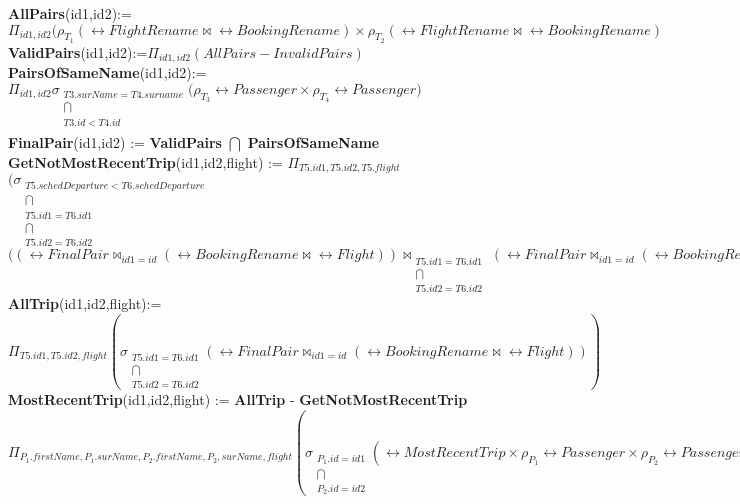 \begin{enumerate}[label=\textbf{\arabic*.}]
\textbf{AllPairs}(id1,id2):=$\Pi_{id1,id2}(\rho_{T_1}(\rel{FlightRename} \bowtie \rel{BookingRename}) \times \rho_{T_2}(\rel{FlightRename} \bowtie \rel{BookingRename})$\\

\textbf{ValidPairs}(id1,id2):=$\Pi_{id1,id2}(AllPairs-InvalidPairs)$\\

\textbf{PairsOfSameName}(id1,id2):=$\Pi_{id1,id2}\sigma_{\substack{T3.surName=T4.surname \\ \bigcap \\ T3.id < T4.id \\}}\bigg(\rho_{T_3} \rel{Passenger} \times \rho_{T_4} \rel{Passenger}\bigg)$\\

\textbf{FinalPair}(id1,id2) := \textbf{ValidPairs} $\bigcap$ \textbf{PairsOfSameName}\\

\textbf{GetNotMostRecentTrip}(id1,id2,flight) := $\Pi_{T5.id1,T5.id2,T5.flight}$
$(\sigma_{\substack{T5.schedDeparture<T6.schedDeparture \\ \bigcap \\ T5.id1=T6.id1 \\ \bigcap \\ T5.id2=T6.id2}}$\\$\bigg((\rel{FinalPair} \bowtie_{id1=id} (\rel{BookingRename} \bowtie \rel{Flight})) \bowtie_{\substack{T5.id1=T6.id1 \\ \bigcap \\ T5.id2 = T6.id2}} (\rel{FinalPair} \bowtie_{id1=id} (\rel{BookingRename} \bowtie \rel{Flight})))\bigg)$\\

\textbf{AllTrip}(id1,id2,flight):=$\Pi_{T5.id1,T5.id2,flight}(\sigma_{\substack{T5.id1=T6.id1 \\ \bigcap \\ T5.id2=T6.id2}}(\rel{FinalPair} \bowtie_{id1=id} (\rel{BookingRename} \bowtie \rel{Flight})))$\\

\textbf{MostRecentTrip}(id1,id2,flight) := \textbf{AllTrip} - \textbf{GetNotMostRecentTrip}\\

$\Pi_{P_1.firstName,P_1.surName,P_2.firstName,P_2,surName,flight}(\sigma_{\substack{P_1.id=id1 \\ \bigcap \\ P_2.id=id2}}(\rel{MostRecentTrip} \times  \rho_{P_1} \rel{Passenger} \times \rho_{P_2} \rel{Passenger}))$\\


\end{enumerate}
